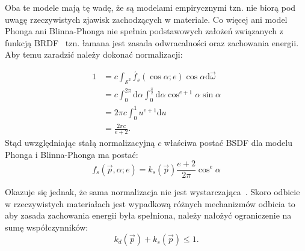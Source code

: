 
Oba te modele mają tę wadę, że są modelami empirycznymi tzn. nie biorą pod uwagę rzeczywistych zjawisk zachodzących w materiale. Co więcej ani model Phonga ani Blinna-Phonga nie spełnia podstawowych założeń związanych z funkcją BRDF~\cite{Lewis94makingshaders} tzn. łamana jest zasada odwracalności oraz zachowania energii. Aby temu zaradzić należy dokonać normalizacji:

\begin{align}
1 &= c\int_{\mathcal{S}^2}\acute{f_s}(\cos\alpha; e)\cos\alpha\mathrm{d}\vec{\omega}\nonumber\\
&= c\int_0^{2\pi}\mathrm{d}\alpha\int_0^{\frac{\pi}{2}}\mathrm{d}\alpha\cos^{e + 1}\alpha\sin\alpha\nonumber\\
&= 2\pi c\int_0^1 u^{e + 1}\mathrm{d}u\nonumber\\
&= \frac{2\pi c}{e + 2}.
\end{align}
Stąd uwzględniając stałą normalizacyjną $c$ właściwa postać BSDF dla modelu Phonga i Blinna-Phonga ma postać:
\begin{equation}
f_s(\vec{p}, \alpha; e) = k_s(\vec{p})\frac{e + 2}{2\pi}\cos^e\alpha
\label{ch1:eq:PhongBRDFNormalized}
\end{equation}

Okazuje się jednak, że sama normalizacja nie jest wystarczająca~\cite{Lafortune94usingthe}. Skoro odbicie w rzeczywistych materiałach jest wypadkową różnych mechanizmów odbicia to aby zasada zachowania energii była spełniona, należy nałożyć ograniczenie na sumę współczynników:
\begin{equation}
k_d(\vec{p}) + k_s(\vec{p}) \leq 1.
\end{equation}

